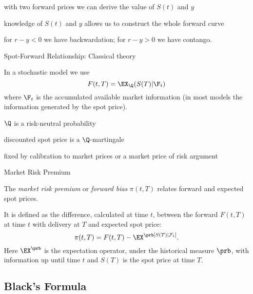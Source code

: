 	with two forward prices we can derive the value of $S(t)$ and $y$


	knowledge of $S(t)$ and $y$ allows us to construct the whole forward curve


	for $r-y <0$ we have backwardation; for $r-y>0$ we have contango.





{Spot-Forward Relationship: Classical theory}






	In a stochastic model we use
$$
F(t,T)=\EX_{\Q}(S(T)|\F_t)
$$
where $\F_t$ is the accumulated available market information (in most models the information generated by the spot price).


	$\Q$ is a risk-neutral probability






	discounted spot price is a $\Q$-martingale


	fixed by calibration to market prices or a market price of risk argument









{Market Risk Premium}






	The \emph{market risk premium} or \emph{forward bias} $\pi (t,T)$
relates forward and expected spot prices.


	It is defined as the difference, calculated at time $t$, between
the forward $F(t,T)$ at time $t$ with delivery at $T$ and expected
spot price:
\begin{equation}\label{forward risk premium}
\pi(t,T)= F(t,T)-\EX^\prb[S(T)|\mathcal F_t].
\end{equation}
Here $\EX^\prb$ is the expectation operator, under the
historical measure $\prb$, with information up until time $t$ and
$S(T)$ is the spot price at time $T$.





\subsection{Black's Formula}

